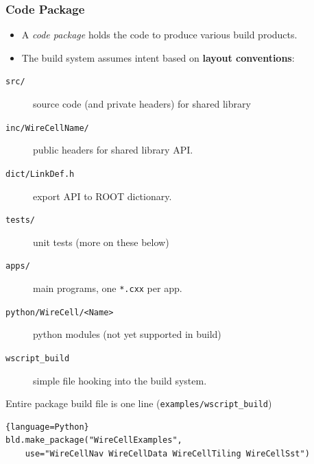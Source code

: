 \documentclass[xcolor=dvipsnames]{beamer}
\begin{document}
\begin{frame}[fragile]
  \frametitle{Code Package}
  \footnotesize
  \begin{itemize}
  \item A \textit{code package} holds the code to produce various build products.
  \item The build system assumes intent based on \textbf{layout conventions}:
  \end{itemize}
  \begin{description}
  \item[\texttt{src/}] source code (and private headers) for shared library
  \item[\texttt{inc/WireCellName/}]  public headers for shared library
    API.
  \item[\texttt{dict/LinkDef.h}] export API to ROOT dictionary.
  \item[\texttt{tests/}] unit tests (more on these below)
  \item[\texttt{apps/}] main programs, one \texttt{*.cxx} per app.
  \item[\texttt{python/WireCell/<Name>}] python modules (not yet
    supported in build)
  \item[\texttt{wscript\_build}] simple file hooking into the build system.
  \end{description}

  \vspace{1mm}

  Entire package build file is one line (\texttt{examples/wscript\_build})
  \begin{lstlisting}{language=Python}
bld.make_package("WireCellExamples", 
    use="WireCellNav WireCellData WireCellTiling WireCellSst")
  \end{lstlisting}
\end{frame}
\end{document}
